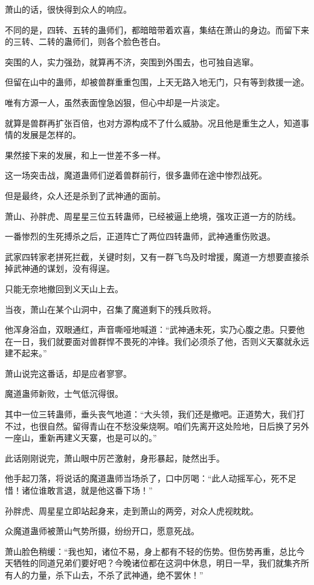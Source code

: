 \begin{this_body}
萧山的话，很快得到众人的响应。

不同的是，四转、五转的蛊师们，都暗暗带着欢喜，集结在萧山的身边。而留下来的三转、二转的蛊师们，则各个脸色苍白。

突围的人，实力强劲，就算再不济，突围到外围去，也可独自逃窜。

但留在山中的蛊师，却被兽群重重包围，上天无路入地无门，只有等到救援一途。

唯有方源一人，虽然表面惶急凶狠，但心中却是一片淡定。

就算是兽群再扩张百倍，也对方源构成不了什么威胁。况且他是重生之人，知道事情的发展是怎样的。

果然接下来的发展，和上一世差不多一样。

这一场突击战，魔道蛊师们逆着兽群前行，很多蛊师在途中惨烈战死。

但是最终，众人还是杀到了武神通的面前。

萧山、孙胖虎、周星星三位五转蛊师，已经被逼上绝境，强攻正道一方的防线。

一番惨烈的生死搏杀之后，正道阵亡了两位四转蛊师，武神通重伤败退。

武家四转家老拼死拦截，关键时刻，又有一群飞鸟及时增援，魔道一方想要直接杀掉武神通的谋划，没有得逞。

只能无奈地撤回到义天山上去。

当夜，萧山在某个山洞中，召集了魔道剩下的残兵败将。

他浑身浴血，双眼通红，声音嘶哑地喊道：“武神通未死，实乃心腹之患。只要他在一日，我们就要面对兽群悍不畏死的冲锋。我们必须杀了他，否则义天寨就永远建不起来。”

萧山说完这番话，却是应者寥寥。

魔道蛊师新败，士气低沉得很。

其中一位三转蛊师，垂头丧气地道：“大头领，我们还是撤吧。正道势大，我们打不过，也很自然。留得青山在不愁没柴烧啊。咱们先离开这处险地，日后换了另外一座山，重新再建义天寨，也是可以的。”

此话刚刚说完，萧山眼中厉芒激射，身形暴起，陡然出手。

他手起刀落，将说话的魔道蛊师当场杀了，口中厉喝：“此人动摇军心，死不足惜！诸位谁敢言退，就是他这番下场！”

孙胖虎、周星星立即站起身来，走到萧山的两旁，对众人虎视眈眈。

众魔道蛊师被萧山气势所摄，纷纷开口，愿意死战。

萧山脸色稍缓：“我也知，诸位不易，身上都有不轻的伤势。但伤势再重，总比今天牺牲的同道兄弟们要好吧？今晚诸位都在这洞中休息，明日一早，我们就集齐所有人的力量，杀下山去，不杀了武神通，绝不罢休！”


\end{this_body}
